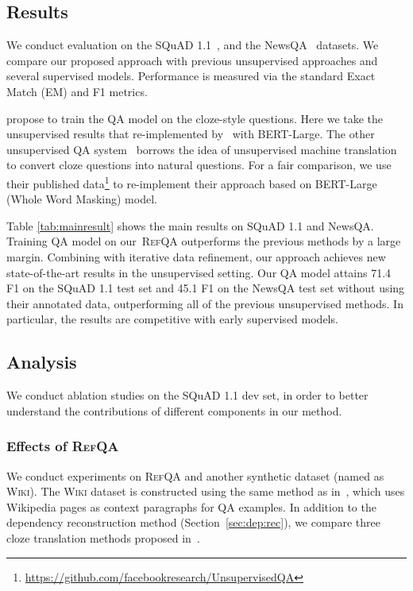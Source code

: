 \documentclass[11pt,a4paper]{article}
\newcommand\refqa{\textsc{RefQA}}
\begin{document}
\subsection{Results}
We conduct evaluation on the SQuAD 1.1~\citep{squad1}, and the NewsQA~\citep{newsqa2017} datasets.
We compare our proposed approach with previous unsupervised approaches and several supervised models. 
Performance is measured via the standard Exact Match (EM) and F1 metrics.






\citet{dhingra2019semi} propose to train the QA model on the cloze-style questions. Here we take the unsupervised results that re-implemented by~\citet{lewis2019unsupervisedqa} with BERT-Large.
The other unsupervised QA system~\cite{lewis2019unsupervisedqa} borrows the idea of unsupervised machine translation~\citep{lample2017unsupervised} to convert cloze questions into natural questions.
For a fair comparison, we use their published data\footnote{\url{https://github.com/facebookresearch/UnsupervisedQA}} to re-implement their approach based on BERT-Large (Whole Word Masking) model.

Table \ref{tab:mainresult} shows the main results on SQuAD 1.1 and NewsQA. Training QA model on our~\refqa{} outperforms the previous methods by a large margin.
Combining with iterative data refinement, our approach achieves new state-of-the-art results in the unsupervised setting.
Our QA model attains 71.4 F1 on the SQuAD 1.1 test set and 45.1 F1 on the NewsQA test set without using their annotated data, outperforming all of the previous unsupervised methods.
In particular, the results are competitive with early supervised models.

\subsection{Analysis}

We conduct ablation studies on the SQuAD 1.1 dev set, in order to better understand the contributions of different components in our method.

\subsubsection{Effects of \refqa{}}

We conduct experiments on \refqa{} and another synthetic dataset (named as \textsc{Wiki}). The \textsc{Wiki} dataset is constructed using the same method as in~\citet{lewis2019unsupervisedqa}, which uses Wikipedia pages as context paragraphs for QA examples.
In addition to the dependency reconstruction method (Section~\ref{sec:dep:rec}), we compare three cloze translation methods proposed in~\citet{lewis2019unsupervisedqa}.
\end{document}
